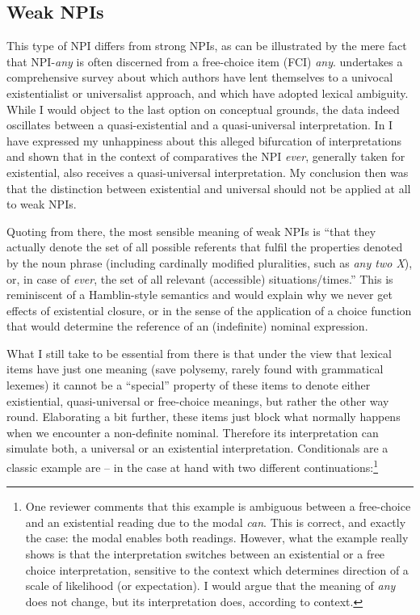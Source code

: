 \documentclass[output=paper,colorlinks,citecolor=brown,
]{langscibook}
\begin{document}
\subsection{Weak NPIs}

This type of NPI differs from strong NPIs, as can be illustrated by the mere fact that NPI-\textit{any} is often discerned from a free-choice item (FCI) \textit{any}. \citet{horn2000a} undertakes
a comprehensive survey about which authors have lent themselves to a univocal existentialist or universalist approach, and
which have adopted lexical ambiguity. While I would object to the last option on conceptual grounds, the data indeed
oscillates between a quasi-existential and a quasi-universal interpretation. In \citet{neubarth2017} I have expressed
my unhappiness about this alleged bifurcation of interpretations and shown that in the context of comparatives the NPI
\textit{ever}, generally taken for existential, also receives a quasi-universal interpretation. My conclusion then was
that the distinction between existential and universal should not be applied at all to weak NPIs.

Quoting from there, the most sensible meaning of weak NPIs is ``that they actually denote the set of all possible
referents that fulfil the properties denoted by the noun phrase (including cardinally modified pluralities, such as
{\em any two X}), or, in case of {\em ever}, the set of all relevant (accessible) situations/times.'' This is
reminiscent of a Hamblin-style semantics \citep{hamblin1973} and would explain why we never get effects of existential
closure, or in the sense of \citet{reinhart1997} the application of a choice function that would determine the reference
of an (indefinite) nominal expression.

What I still take to be essential from there is that under the view that lexical items have just one meaning (save
polysemy, rarely found with grammatical lexemes) it cannot be a “special” property of these items to denote
either existiential, quasi-universal or free-choice meanings, but rather the other way round. Elaborating a bit
further, these items just block what normally happens when we encounter a non-definite nominal. Therefore its
interpretation can simulate both, a universal or an existential interpretation. Conditionals are a classic example are  -- in the case at hand with two different continuations:\footnote{One reviewer comments that this example is ambiguous between a free-choice and an existential reading due to the modal \textit{can}. This is correct, and exactly the case: the modal enables both readings. However, what the example really shows is that the
interpretation switches between an existential or a free choice interpretation, sensitive to the context which
determines direction of a scale of likelihood (or expectation). I would argue that the meaning of {\em any} does not change, but its interpretation does, according to context.}
\end{document}
